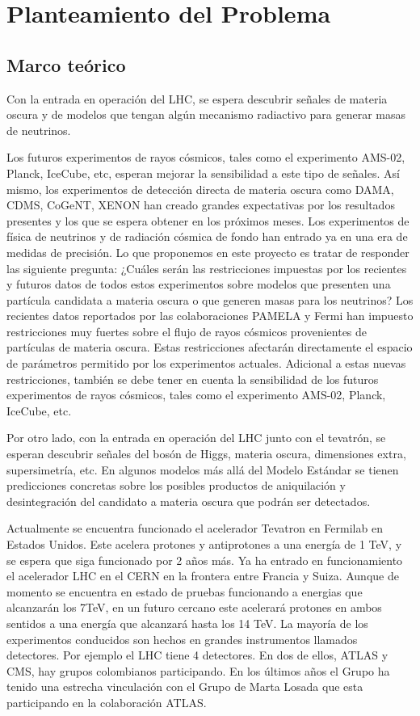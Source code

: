 \section{ Planteamiento del Problema }

\subsection{Marco teórico}

Con la entrada en operación del LHC, se espera descubrir señales de materia oscura y de modelos que tengan algún mecanismo radiactivo para generar masas de neutrinos.

Los futuros experimentos de rayos cósmicos, tales como el experimento AMS-02, Planck, IceCube, etc, esperan mejorar la sensibilidad a este tipo de señales. Así mismo, los experimentos de detección directa de materia oscura como DAMA, CDMS, CoGeNT, XENON han creado grandes expectativas por los resultados presentes y los que se espera obtener en los próximos meses. Los experimentos de física de neutrinos y de radiación cósmica de fondo han entrado ya en una era de medidas de precisión.
Lo que proponemos en este proyecto es tratar de responder las siguiente pregunta: ¿Cuáles serán las restricciones impuestas por los recientes y futuros datos de todos estos experimentos sobre  modelos que presenten una partícula candidata a materia oscura o que generen masas para los neutrinos?
Los recientes datos reportados por las colaboraciones PAMELA y Fermi han impuesto restricciones muy fuertes sobre el flujo de rayos cósmicos provenientes de partículas de materia oscura. Estas restricciones afectarán directamente el espacio de parámetros permitido por los experimentos actuales. Adicional a estas nuevas restricciones, también se debe tener en cuenta la sensibilidad de los futuros experimentos de rayos cósmicos, tales como el experimento AMS-02, Planck, IceCube, etc.

Por otro lado, con la entrada en operación del LHC junto con el tevatrón, se esperan descubrir señales del bosón de Higgs, materia oscura, dimensiones extra, supersimetría, etc. En algunos modelos más allá del Modelo Estándar se tienen predicciones concretas sobre los posibles productos de aniquilación y desintegración del candidato a materia oscura que podrán ser detectados.

Actualmente se encuentra funcionado el acelerador Tevatron en Fermilab en Estados Unidos. Este acelera protones y antiprotones a una energía de 1 TeV, y se espera que siga funcionado por 2 años más. Ya ha entrado en funcionamiento el acelerador LHC en el CERN en la frontera entre Francia y Suiza. Aunque de momento se encuentra en estado de pruebas funcionando a energias que alcanzarán los 7TeV, en un futuro cercano este  acelerará protones en ambos sentidos a una energía que alcanzará hasta los 14 TeV. La mayoría de los experimentos conducidos son hechos en grandes instrumentos llamados detectores. Por ejemplo el LHC tiene 4 detectores. En dos de ellos, ATLAS y CMS, hay grupos colombianos participando. En los últimos años el Grupo ha tenido una estrecha vinculación con el Grupo de Marta Losada que esta participando en la colaboración ATLAS.

